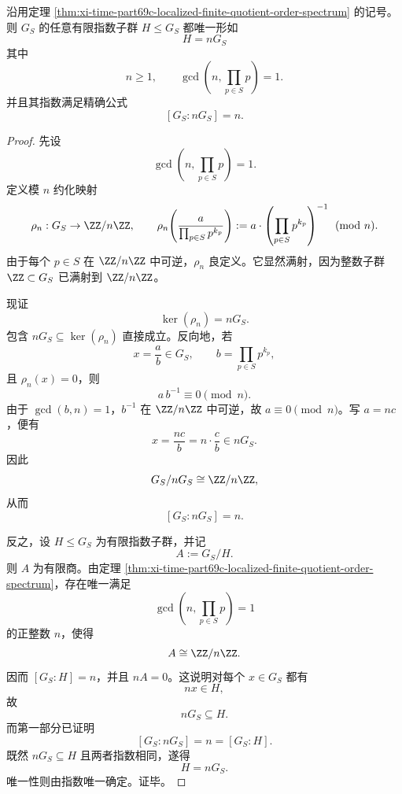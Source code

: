 \begin{theorem}[局部化数系的有限指数子群完全分类]\label{thm:xi-time-part69c-localized-finite-index-subgroup-classification}
沿用定理 \ref{thm:xi-time-part69c-localized-finite-quotient-order-spectrum} 的记号。则 \(G_S\) 的任意有限指数子群 \(H\le G_S\) 都唯一形如
\[
H=nG_S
\]
其中
\[
n\ge 1,
\qquad
\gcd\!\left(n,\prod_{p\in S}p\right)=1.
\]
并且其指数满足精确公式
\[
[G_S:nG_S]=n.
\]
\end{theorem}
\begin{proof}
先设
\[
\gcd\!\left(n,\prod_{p\in S}p\right)=1.
\]
定义模 \(n\) 约化映射
\[
\rho_n:G_S\to \ZZ/n\ZZ,
\qquad
\rho_n\!\left(\frac{a}{\prod_{p\in S}p^{k_p}}\right)
:=
a\cdot\left(\prod_{p\in S}p^{k_p}\right)^{-1}\pmod n.
\]
由于每个 \(p\in S\) 在 \(\ZZ/n\ZZ\) 中可逆，\(\rho_n\) 良定义。它显然满射，因为整数子群 \(\ZZ\subset G_S\) 已满射到 \(\ZZ/n\ZZ\)。

现证
\[
\ker(\rho_n)=nG_S.
\]
包含 \(nG_S\subseteq \ker(\rho_n)\) 直接成立。反向地，若
\[
x=\frac{a}{b}\in G_S,
\qquad
b=\prod_{p\in S}p^{k_p},
\]
且 \(\rho_n(x)=0\)，则
\[
a\,b^{-1}\equiv 0\pmod n.
\]
由于 \(\gcd(b,n)=1\)，\(b^{-1}\) 在 \(\ZZ/n\ZZ\) 中可逆，故 \(a\equiv 0\pmod n\)。写 \(a=nc\)，便有
\[
x=\frac{nc}{b}=n\cdot \frac{c}{b}\in nG_S.
\]
因此
\[
G_S/nG_S\cong \ZZ/n\ZZ,
\]
从而
\[
[G_S:nG_S]=n.
\]

反之，设 \(H\le G_S\) 为有限指数子群，并记
\[
A:=G_S/H.
\]
则 \(A\) 为有限商。由定理
\ref{thm:xi-time-part69c-localized-finite-quotient-order-spectrum}，存在唯一满足
\[
\gcd\!\left(n,\prod_{p\in S}p\right)=1
\]
的正整数 \(n\)，使得
\[
A\cong \ZZ/n\ZZ.
\]
因而 \([G_S:H]=n\)，并且 \(nA=0\)。这说明对每个 \(x\in G_S\) 都有
\[
nx\in H,
\]
故
\[
nG_S\subseteq H.
\]
而第一部分已证明
\[
[G_S:nG_S]=n=[G_S:H].
\]
既然 \(nG_S\subseteq H\) 且两者指数相同，遂得
\[
H=nG_S.
\]
唯一性则由指数唯一确定。证毕。
\end{proof}


